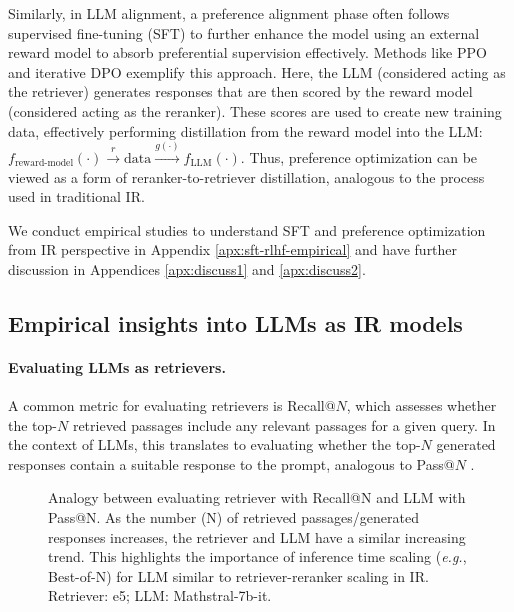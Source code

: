 Similarly, in LLM alignment, a preference alignment phase often follows supervised fine-tuning (SFT) to further enhance the model using an external reward model to absorb preferential supervision effectively.
Methods like PPO \citep{schulman2017proximal} and iterative DPO \citep{guo2024direct} exemplify this approach.  
Here, the LLM (considered acting as the retriever) generates responses that are then scored by the reward model (considered acting as the reranker). 
These scores are used to create new training data, effectively performing distillation from the reward model into the LLM: 
$f_{\text{reward-model}}(\cdot) \overset{r}{\rightarrow}  \text{data} \overset{g(\cdot)}{\rightarrow} f_{\text{LLM}}(\cdot)$. 
Thus, preference optimization can be viewed as a form of reranker-to-retriever distillation, analogous to the process used in traditional IR.

We conduct empirical studies to understand SFT and preference optimization from IR perspective in Appendix \ref{apx:sft-rlhf-empirical} and have further discussion in Appendices \ref{apx:discuss1} and \ref{apx:discuss2}.


\subsection{Empirical insights into LLMs as IR models}\label{sec:empirical}

\paragraph{Evaluating LLMs as retrievers.}
A common metric for evaluating retrievers is Recall@$N$, which assesses whether the top-$N$ retrieved passages include any relevant passages for a given query. 
In the context of LLMs, this translates to evaluating whether the top-$N$ generated responses contain a suitable response to the prompt, analogous to Pass@$N$ \citep{chen2021evaluating}.

\begin{figure}[h!]
    \centering
    \hspace{1cm}
    \caption{Analogy between evaluating retriever with Recall@N and LLM with Pass@N. As the number (N) of retrieved passages/generated responses increases, the retriever and LLM have a similar increasing trend. This highlights the importance of inference time scaling (\textit{e.g.}, Best-of-N) for LLM similar to retriever-reranker scaling in IR. Retriever: e5; LLM: Mathstral-7b-it.}\label{fig:mathstral-gsm8k-infer}
\end{figure}

